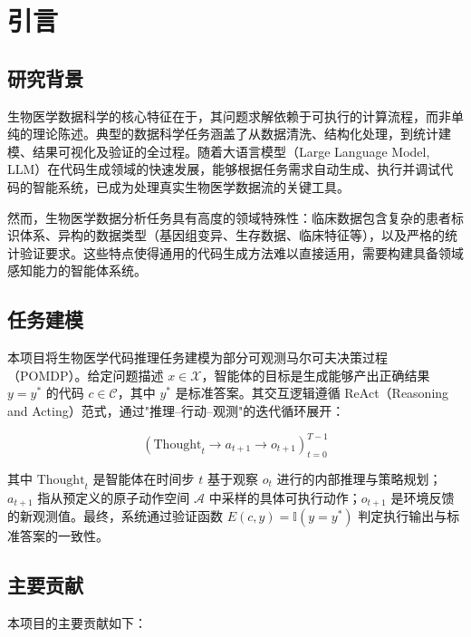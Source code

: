 \section{引言}

\subsection{研究背景}

生物医学数据科学的核心特征在于，其问题求解依赖于可执行的计算流程，而非单纯的理论陈述。典型的数据科学任务涵盖了从数据清洗、结构化处理，到统计建模、结果可视化及验证的全过程。随着大语言模型（Large Language Model, LLM）在代码生成领域的快速发展，能够根据任务需求自动生成、执行并调试代码的智能系统，已成为处理真实生物医学数据流的关键工具。

然而，生物医学数据分析任务具有高度的领域特殊性：临床数据包含复杂的患者标识体系、异构的数据类型（基因组变异、生存数据、临床特征等），以及严格的统计验证要求。这些特点使得通用的代码生成方法难以直接适用，需要构建具备领域感知能力的智能体系统。

\subsection{任务建模}

本项目将生物医学代码推理任务建模为部分可观测马尔可夫决策过程（POMDP）。给定问题描述 $x \in \mathcal{X}$，智能体的目标是生成能够产出正确结果 $y = y^*$ 的代码 $c \in \mathcal{C}$，其中 $y^*$ 是标准答案。其交互逻辑遵循 ReAct（Reasoning and Acting）范式\cite{yao2023react}，通过"推理--行动--观测"的迭代循环展开：

\begin{equation}
(\text{Thought}_t \rightarrow a_{t+1} \rightarrow o_{t+1})_{t=0}^{T-1}
\end{equation}

其中 $\text{Thought}_t$ 是智能体在时间步 $t$ 基于观察 $o_t$ 进行的内部推理与策略规划；$a_{t+1}$ 指从预定义的原子动作空间 $\mathcal{A}$ 中采样的具体可执行动作；$o_{t+1}$ 是环境反馈的新观测值。最终，系统通过验证函数 $E(c, y) = \mathbb{I}(y = y^*)$ 判定执行输出与标准答案的一致性。

\subsection{主要贡献}

本项目的主要贡献如下：

